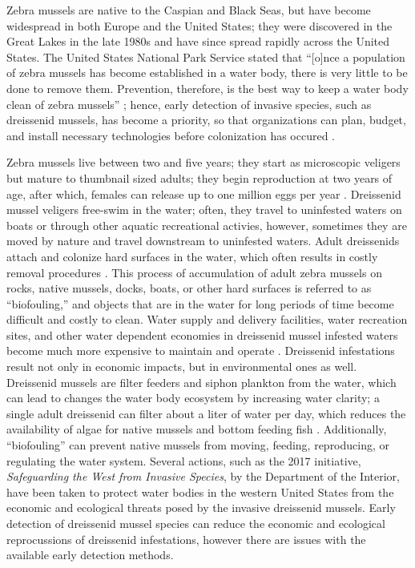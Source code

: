 \documentclass[12pt]{article}\usepackage[]{graphicx}\usepackage[]{color}
\begin{document}
Zebra mussels are native to the Caspian and Black Seas, but have become widespread in both Europe and the United States; they were discovered in the Great Lakes in the late 1980s and have since spread rapidly across the United States. The United States National Park Service stated that ``[o]nce a population of zebra mussels has become established in a water body, there is very little to be done to remove them. Prevention, therefore, is the best way to keep a water body clean of zebra mussels'' \cite{NPS}; hence, early detection of invasive species, such as dreissenid mussels, has become a priority, so that organizations can plan, budget, and install necessary technologies before colonization has occured \cite{Holser:body}. 

Zebra mussels live between two and five years; they start as microscopic veligers but mature to thumbnail sized adults; they begin reproduction at two years of age, after which, females can release up to one million eggs per year \cite{NPS}. Dreissenid mussel veligers free-swim in the water; often, they travel to uninfested waters on boats or through other aquatic recreational activies, however, sometimes they are moved by nature and travel downstream to uninfested waters. Adult dreissenids attach and colonize hard surfaces in the water, which often results in costly removal procedures \cite{Holser:detection}. This process of accumulation of adult zebra mussels on rocks, native mussels, docks, boats, or other hard surfaces is referred to as ``biofouling,'' and objects that are in the water for long periods of time become difficult and costly to clean. Water supply and delivery facilities, water recreation sites, and other water dependent economies in dreissenid mussel infested waters become much more expensive to maintain and operate \cite{BOR}. Dreissenid infestations result not only in economic impacts, but in environmental ones as well. Dreissenid mussels are filter feeders and siphon plankton from the water, which can lead to changes the water body ecosystem by increasing water clarity; a single adult dreissenid can filter about a liter of water per day, which reduces the availability of algae for native mussels and bottom feeding fish \cite{BOR}. Additionally, ``biofouling'' can prevent native mussels from moving, feeding, reproducing, or regulating the water system. Several actions, such as the 2017 initiative, \textit{Safeguarding the West from Invasive Species}, by the Department of the Interior, have been taken to protect water bodies in the western United States from the economic and ecological threats posed by the invasive dreissenid mussels. Early detection of dreissenid mussel species can reduce the economic and ecological reprocussions of dreissenid infestations, however there are issues with the available early detection methods. 
\end{document}
